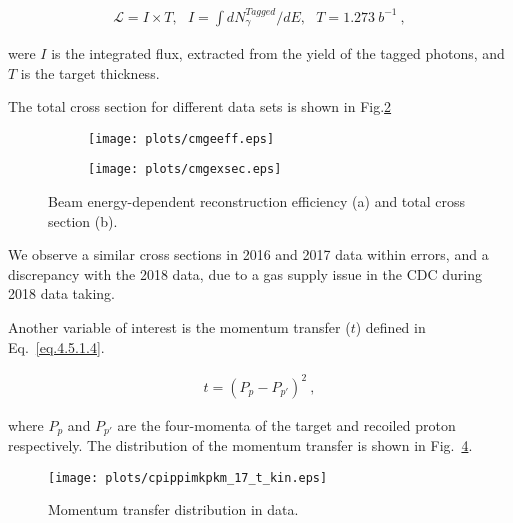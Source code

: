 \begin{equation}
    \label{eq.4.5.1.3}
    \begin{aligned}
        \mathcal{L}=I \times T,~~~ I=\int dN_{\gamma}^{Tagged}/dE,~~~ T = 1.273~b^{-1}~,
    \end{aligned}
\end{equation}

were $I$ is the integrated flux, extracted from the yield of the tagged photons, and $T$ is the target thickness.
\par The total cross section for different data sets is shown in Fig.\ref{fig.4.5.1.4.b}

\begin{figure}[H]
    \centering
    \begin{subfigure}[b]{0.45\textwidth}
        \texttt{[image: plots/cmgeeff.eps]}
        \caption{}
        \label{fig.4.5.1.4.a}
    \end{subfigure}
    \begin{subfigure}[b]{0.45\textwidth}
        \texttt{[image: plots/cmgexsec.eps]}
        \caption{}
        \label{fig.4.5.1.4.b}
    \end{subfigure}
    \caption{Beam energy-dependent reconstruction efficiency (a) and total cross section (b).}
    \label{fig:4.5.1.4}
\end{figure}

We observe a similar cross sections in 2016 and 2017 data within errors, and a discrepancy with the 2018 data, due to a gas supply issue in the CDC during 2018 data taking.  
\par Another variable of interest is the momentum transfer ($t$) defined in Eq.~\ref{eq.4.5.1.4}.

\begin{equation}
    \label{eq.4.5.1.4}
    \begin{aligned}
        t = (P_{p} - P_{p'})^2~, 
    \end{aligned}
\end{equation}

where $P_{p}$ and $P_{p'}$ are the four-momenta of the target and recoiled proton respectively. The distribution of the momentum transfer is shown in Fig.~\ref{fig.4.5.1.5}.

\begin{figure}[H]
    \centering
    \texttt{[image: plots/cpippimkpkm\_17\_t\_kin.eps]}
    \caption{\label{fig.4.5.1.5}Momentum transfer distribution in data.}
\end{figure}

